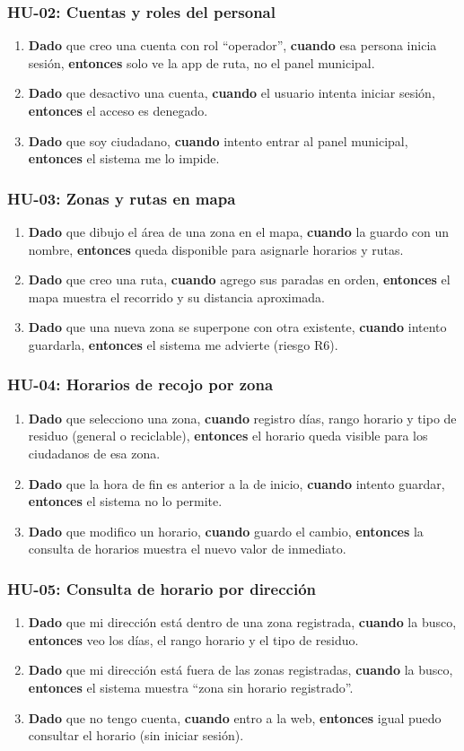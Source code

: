 \documentclass[11pt,a4paper]{article}
\newcommand{\dce}[3]{\textbf{Dado} #1, \textbf{cuando} #2, \textbf{entonces} #3}
\newcommand{\criterios}[1]{\subsubsection*{#1}}
\begin{document}
\criterios{HU-02: Cuentas y roles del personal}
\begin{enumerate}
  \item \dce{que creo una cuenta con rol ``operador''}{esa persona inicia sesión}{solo ve la app de ruta, no el panel municipal.}
  \item \dce{que desactivo una cuenta}{el usuario intenta iniciar sesión}{el acceso es denegado.}
  \item \dce{que soy ciudadano}{intento entrar al panel municipal}{el sistema me lo impide.}
\end{enumerate}

\criterios{HU-03: Zonas y rutas en mapa}
\begin{enumerate}
  \item \dce{que dibujo el área de una zona en el mapa}{la guardo con un nombre}{queda disponible para asignarle horarios y rutas.}
  \item \dce{que creo una ruta}{agrego sus paradas en orden}{el mapa muestra el recorrido y su distancia aproximada.}
  \item \dce{que una nueva zona se superpone con otra existente}{intento guardarla}{el sistema me advierte (riesgo R6).}
\end{enumerate}

\criterios{HU-04: Horarios de recojo por zona}
\begin{enumerate}
  \item \dce{que selecciono una zona}{registro días, rango horario y tipo de residuo (general o reciclable)}{el horario queda visible para los ciudadanos de esa zona.}
  \item \dce{que la hora de fin es anterior a la de inicio}{intento guardar}{el sistema no lo permite.}
  \item \dce{que modifico un horario}{guardo el cambio}{la consulta de horarios muestra el nuevo valor de inmediato.}
\end{enumerate}

\criterios{HU-05: Consulta de horario por dirección}
\begin{enumerate}
  \item \dce{que mi dirección está dentro de una zona registrada}{la busco}{veo los días, el rango horario y el tipo de residuo.}
  \item \dce{que mi dirección está fuera de las zonas registradas}{la busco}{el sistema muestra ``zona sin horario registrado''.}
  \item \dce{que no tengo cuenta}{entro a la web}{igual puedo consultar el horario (sin iniciar sesión).}
\end{enumerate}
\end{document}
